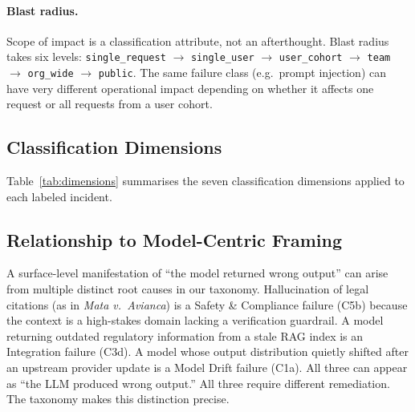 \documentclass{article}
\begin{document}
\paragraph{Blast radius.}
Scope of impact is a classification attribute, not an afterthought.  Blast
radius takes six levels: \texttt{single\_request} $\to$ \texttt{single\_user}
$\to$ \texttt{user\_cohort} $\to$ \texttt{team} $\to$ \texttt{org\_wide}
$\to$ \texttt{public}.  The same failure class (e.g.\ prompt injection) can
have very different operational impact depending on whether it affects one
request or all requests from a user cohort.

\subsection{Classification Dimensions}

Table~\ref{tab:dimensions} summarises the seven classification dimensions
applied to each labeled incident.

\begin{table}[t]
\caption{Taxonomy classification dimensions.}
\label{tab:dimensions}
\centering
\small
{}
\end{table}

\subsection{Relationship to Model-Centric Framing}

A surface-level manifestation of ``the model returned wrong output'' can arise
from multiple distinct root causes in our taxonomy.  Hallucination of legal
citations (as in \emph{Mata v.\ Avianca}) is a Safety \& Compliance failure
(C5b) because the context is a high-stakes domain lacking a verification
guardrail.  A model returning outdated regulatory information from a stale RAG
index is an Integration failure (C3d).  A model whose output distribution
quietly shifted after an upstream provider update is a Model Drift failure (C1a).
All three can appear as ``the LLM produced wrong output.'' All three require
different remediation.  The taxonomy makes this distinction precise.
\end{document}
